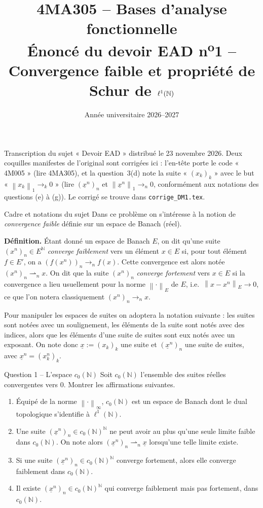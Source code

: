 \documentclass[11pt,a4paper]{article}
\title{\textbf{4MA305 -- Bases d'analyse fonctionnelle}\\[2mm]
\Large Énoncé du devoir EAD n\textsuperscript{o}1 -- Convergence faible et propriété de Schur de $\ell^1(\N)$}
\author{}
\date{Année universitaire 2026--2027}
\newcommand{\N}{\mathbb{N}}
\newcommand{\norm}[1]{\left\|#1\right\|}
\newcommand{\wk}{\rightharpoonup}
\theoremstyle{definition}
\newcommand{\su}[1]{\underline{#1}}
\newcommand{\lun}{\ell^1(\N)}
\newcommand{\cz}{c_0(\N)}
\begin{document}
\maketitle

\begin{commentaire}
Transcription du sujet « Devoir EAD » distribué le 23 novembre 2026. Deux coquilles manifestes de l'original sont corrigées ici : l'en-tête porte le code « 4M005 » (lire 4MA305), et la question~3(d) note la suite « $(x_k)_k$ » avec le but « $\norm{x_k}_1\to_k0$ » (lire $(\su x^n)_n$ et $\norm{\su x^n}_1\to_n0$, conformément aux notations des questions (e) à (g)). Le corrigé se trouve dans \texttt{corrige\_DM1.tex}.
\end{commentaire}

\begin{exo}{Cadre et notations du sujet}
Dans ce problème on s'intéresse à la notion de \emph{convergence faible} définie sur un espace de Banach (réel).

\medskip
\noindent\textbf{Définition.} Étant donné un espace de Banach $E$, on dit qu'une suite $(x^n)_n\in E^\N$ \emph{converge faiblement} vers un élément $x\in E$ si, pour tout élément $f\in E'$, on a $(f(x^n))_n\to_n f(x)$. Cette convergence est alors notée $(x^n)_n\wk_n x$. On dit que la suite $(x^n)_n$ \emph{converge fortement} vers $x\in E$ si la convergence a lieu usuellement pour la norme $\norm\cdot_E$ de $E$, i.e.\ $\norm{x-x^n}_E\to0$, ce que l'on notera classiquement $(x^n)_n\to_n x$.

\medskip
Pour manipuler les espaces de suites on adoptera la notation suivante : les suites sont notées avec un soulignement, les éléments de la suite sont notés avec des indices, alors que les éléments d'une suite de suites sont eux notés avec un exposant. On note donc $\su x:=(x_k)_k$ une suite et $(\su x^n)_n$ une suite de suites, avec $\su x^n=(x^n_k)_k$.
\end{exo}

\begin{exo}{Question 1 -- L'espace $c_0(\N)$}
Soit $\cz$ l'ensemble des suites réelles convergentes vers $0$. Montrer les affirmations suivantes.
\begin{enumerate}[label=(\alph*)]
  \item Équipé de la norme $\norm\cdot_\infty$, $\cz$ est un espace de Banach dont le dual topologique s'identifie à $\lun$.
  \item Une suite $(\su x^n)_n\in\cz^\N$ ne peut avoir au plus qu'une seule limite faible dans $\cz$. On note alors $(\su x^n)_n\wk_n\su x$ lorsqu'une telle limite existe.
  \item Si une suite $(\su x^n)_n\in\cz^\N$ converge fortement, alors elle converge faiblement dans $\cz$.
  \item Il existe $(\su x^n)_n\in\cz^\N$ qui converge faiblement mais pas fortement, dans $\cz$.
\end{enumerate}
\end{exo}
\end{document}
